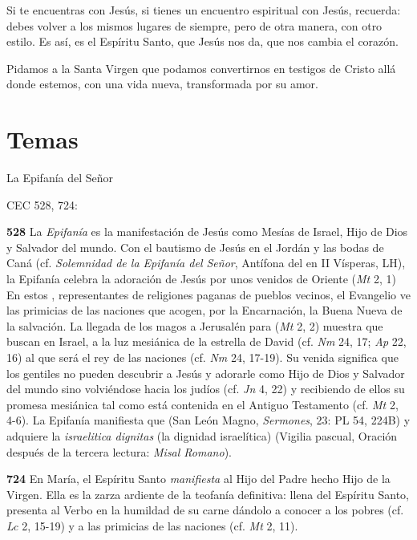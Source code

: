 {Si te encuentras con Jesús, si tienes un encuentro espiritual con Jesús, recuerda: debes volver a los mismos lugares de siempre, pero de otra manera, con otro estilo. Es así, es el Espíritu Santo, que Jesús nos da, que nos cambia el corazón.

Pidamos a la Santa Virgen que podamos convertirnos en testigos de Cristo allá donde estemos, con una vida nueva, transformada por su amor.



\section{Temas}

La Epifanía del Señor

CEC 528, 724:

\textbf{528} La \emph{Epifanía} es la manifestación de Jesús como Mesías de Israel, Hijo de Dios y Salvador del mundo. Con el bautismo de Jesús en el Jordán y las bodas de Caná (cf. \emph{Solemnidad de la Epifanía del Señor}, Antífona del  en II Vísperas, LH), la Epifanía celebra la adoración de Jesús por unos  venidos de Oriente (\emph{Mt} 2, 1) En estos , representantes de religiones paganas de pueblos vecinos, el Evangelio ve las primicias de las naciones que acogen, por la Encarnación, la Buena Nueva de la salvación. La llegada de los magos a Jerusalén para  (\emph{Mt} 2, 2) muestra que buscan en Israel, a la luz mesiánica de la estrella de David (cf. \emph{Nm} 24, 17; \emph{Ap} 22, 16) al que será el rey de las naciones (cf. \emph{Nm} 24, 17-19). Su venida significa que los gentiles no pueden descubrir a Jesús y adorarle como Hijo de Dios y Salvador del mundo sino volviéndose hacia los judíos (cf. \emph{Jn} 4, 22) y recibiendo de ellos su promesa mesiánica tal como está contenida en el Antiguo Testamento (cf. \emph{Mt} 2, 4-6). La Epifanía manifiesta que  (San León Magno, \emph{Sermones}, 23: PL 54, 224B) y adquiere la \emph{israelitica dignitas} (la dignidad israelítica) (Vigilia pascual, Oración después de la tercera lectura: \emph{Misal Romano}).

\textbf{724} En María, el Espíritu Santo \emph{manifiesta} al Hijo del Padre hecho Hijo de la Virgen. Ella es la zarza ardiente de la teofanía definitiva: llena del Espíritu Santo, presenta al Verbo en la humildad de su carne dándolo a conocer a los pobres (cf. \emph{Lc} 2, 15-19) y a las primicias de las naciones (cf. \emph{Mt} 2, 11).

}
